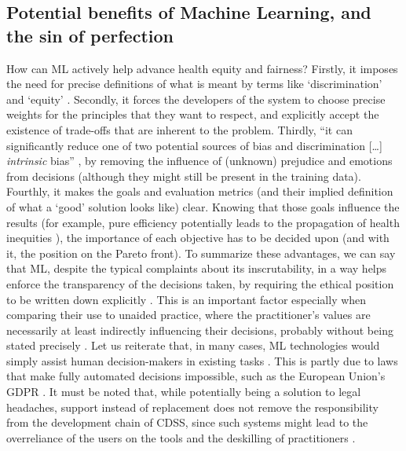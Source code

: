 \subsection{Potential benefits of Machine Learning, and the sin of perfection}
    How can ML actively help advance health equity and fairness?
    Firstly, it imposes the need for precise definitions of what is meant by terms like `discrimination' and `equity' \cite{Zerilli2019}.
    Secondly, it forces the developers of the system to choose precise weights for the principles that they want to respect, and explicitly accept the existence of trade-offs that are inherent to the problem.
    Thirdly, ``it can significantly reduce one of two potential sources of bias and discrimination [\dots] \emph{intrinsic} bias'' \cite[p.~672]{Zerilli2019}, by removing the influence of (unknown) prejudice and emotions from decisions (although they might still be present in the training data).
    Fourthly, it makes the goals and evaluation metrics (and their implied definition of what a `good' solution looks like) clear.
    Knowing that those goals influence the results \cite{Dijkstra2020} (for example, pure efficiency potentially leads to the propagation of health inequities \cite{Rajkomar2018}), the importance of each objective has to be decided upon (and with it, the position on the Pareto front).
    To summarize these advantages, we can say that ML, despite the typical complaints about its inscrutability, in a way helps enforce the transparency of the decisions taken, by requiring the ethical position to be written down explicitly \cite{Williamson2021}.
    This is an important factor especially when comparing their use to unaided practice, where the practitioner's values are necessarily at least indirectly influencing their decisions, probably without being stated precisely \cite{Zerilli2019}.
    Let us reiterate that, in many cases, ML technologies would simply assist human decision-makers in existing tasks \cite{Morley2020}.
    This is partly due to laws that make fully automated decisions impossible, such as the European Union's GDPR \cite{Zerilli2019}.
    It must be noted that, while potentially being a solution to legal headaches, support instead of replacement does not remove the responsibility from the development chain of CDSS, since such systems might lead to the overreliance of the users on the tools and the deskilling of practitioners \cite{Morley2020}.

